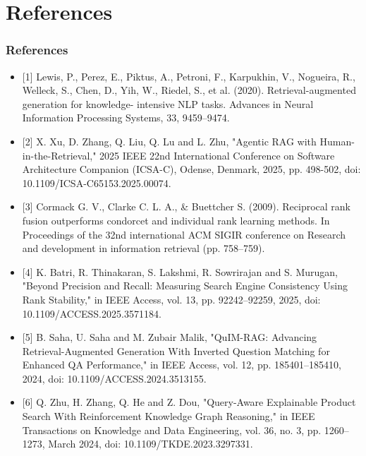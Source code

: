 \section{References}

\begin{frame}
\frametitle{References}

    \begin{itemize}
        \item \tiny[1] Lewis, P., Perez, E., Piktus, A., Petroni, F., Karpukhin, V., Nogueira, R., Welleck, S., Chen, D., Yih, W., Riedel, S., et al. (2020). Retrieval-augmented generation for knowledge- intensive NLP tasks. Advances in Neural Information Processing Systems, 33, 9459–9474.
        \vspace{0.3cm}
    
        \item \tiny[2] X. Xu, D. Zhang, Q. Liu, Q. Lu and L. Zhu, "Agentic RAG with Human-in-the-Retrieval," 2025 IEEE 22nd International Conference on Software Architecture Companion (ICSA-C), Odense, Denmark, 2025, pp. 498-502, doi: 10.1109/ICSA-C65153.2025.00074.
        \vspace{0.3cm}
    
        \item \tiny[3] Cormack G. V., Clarke C. L. A., \& Buettcher S. (2009). Reciprocal rank fusion outperforms condorcet and individual rank learning methods. In Proceedings of the 32nd international ACM SIGIR conference on Research and development in information retrieval (pp. 758–759). 
        \vspace{0.3cm}
        
        \item \tiny [4] K. Batri, R. Thinakaran, S. Lakshmi, R. Sowrirajan and S. Murugan, "Beyond Precision and Recall: Measuring Search Engine Consistency Using Rank Stability," in IEEE Access, vol. 13, pp. 92242–92259, 2025, doi: 10.1109/ACCESS.2025.3571184.
        \vspace{0.3cm}
        
        \item \tiny [5] B. Saha, U. Saha and M. Zubair Malik, "QuIM-RAG: Advancing Retrieval-Augmented Generation With Inverted Question Matching for Enhanced QA Performance," in IEEE Access, vol. 12, pp. 185401–185410, 2024, doi: 10.1109/ACCESS.2024.3513155.
        \vspace{0.3cm}
        
        \item \tiny [6] Q. Zhu, H. Zhang, Q. He and Z. Dou, "Query-Aware Explainable Product Search With Reinforcement Knowledge Graph Reasoning," in IEEE Transactions on Knowledge and Data Engineering, vol. 36, no. 3, pp. 1260–1273, March 2024, doi: 10.1109/TKDE.2023.3297331.
        \vspace{0.3cm}
        

\end{itemize}
\end{frame}
